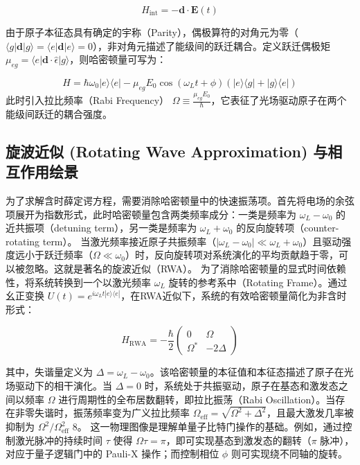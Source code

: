 \documentclass[../main.tex]{subfiles}
\begin{document}
\begin{equation}
H_{\text{int}} = -\mathbf{d} \cdot \mathbf{E}(t)
\end{equation}

由于原子本征态具有确定的宇称（Parity），偶极算符的对角元为零（$\langle g|\mathbf{d}|g\rangle = \langle e|\mathbf{d}|e\rangle = 0$），非对角元描述了能级间的跃迁耦合。定义跃迁偶极矩 $\mu_{eg} = \langle e|\mathbf{d} \cdot \hat{\epsilon}|g\rangle$，则哈密顿量可写为：

\begin{equation}
H = \hbar\omega_0 |e\rangle\langle e| - \mu_{eg} E_0 \cos(\omega_L t + \phi) (|e\rangle\langle g| + |g\rangle\langle e|)
\end{equation}
此时引入拉比频率（Rabi Frequency） $\Omega \equiv \frac{\mu_{eg} E_0}{\hbar}$，它表征了光场驱动原子在两个能级间跃迁的耦合强度。

\subsection{旋波近似 (Rotating Wave Approximation) 与相互作用绘景}
为了求解含时薛定谔方程，需要消除哈密顿量中的快速振荡项。首先将电场的余弦项展开为指数形式，此时哈密顿量包含两类频率成分：一类是频率为 $\omega_L - \omega_0$ 的近共振项（detuning term），另一类是频率为 $\omega_L + \omega_0$ 的反向旋转项（counter-rotating term）。
当激光频率接近原子共振频率（$|\omega_L - \omega_0| \ll \omega_L + \omega_0$）且驱动强度远小于跃迁频率（$\Omega \ll \omega_0$）时，反向旋转项对系统演化的平均贡献趋于零，可以被忽略。这就是著名的旋波近似（RWA）。
为了消除哈密顿量的显式时间依赖性，将系统转换到一个以激光频率 $\omega_L$ 旋转的参考系中（Rotating Frame）。通过幺正变换 $U(t) = e^{i\omega_L t |e\rangle\langle e|}$，在RWA近似下，系统的有效哈密顿量简化为非含时形式：

\begin{equation}
H_{\text{RWA}} = -\frac{\hbar}{2} \begin{pmatrix} 0 & \Omega \\ \Omega^* & -2\Delta \end{pmatrix}
\end{equation}

其中，失谐量定义为 $\Delta = \omega_L - \omega_0$。该哈密顿量的本征值和本征态描述了原子在光场驱动下的相干演化。当 $\Delta = 0$ 时，系统处于共振驱动，原子在基态和激发态之间以频率 $\Omega$ 进行周期性的全布居数翻转，即拉比振荡（Rabi Oscillation）。当存在非零失谐时，振荡频率变为广义拉比频率 $\Omega_{\text{eff}} = \sqrt{\Omega^2 + \Delta^2}$，且最大激发几率被抑制为 $\Omega^2 / \Omega_{\text{eff}}^2$ 8。
这一物理图像是理解单量子比特门操作的基础。例如，通过控制激光脉冲的持续时间 $\tau$ 使得 $\Omega \tau = \pi$，即可实现基态到激发态的翻转（$\pi$ 脉冲），对应于量子逻辑门中的 Pauli-X 操作；而控制相位 $\phi$ 则可实现绕不同轴的旋转。
\end{document}
